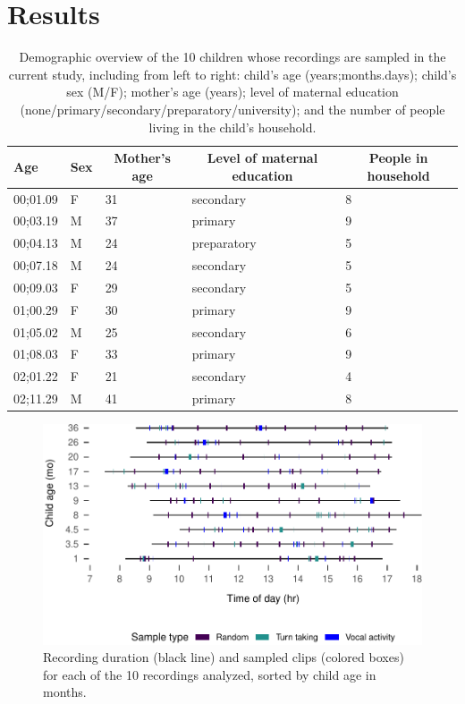 \documentclass[,man,floatsintext]{apa6}
\begin{document}
\section{Results}\label{results}

\begin{table}[tbp]
\begin{center}
\begin{threeparttable}
\caption{\label{tab:tab1}Demographic overview of the 10 children whose recordings are sampled in the current study, including from left to right: child's age (years;months.days); child's sex (M/F); mother's age (years); level of maternal education (none/primary/secondary/preparatory/university); and the number of people living in the child's household.}
\begin{tabular}{lllll}
\toprule
Age & \multicolumn{1}{c}{Sex} & \multicolumn{1}{c}{Mother's age} & \multicolumn{1}{c}{Level of maternal education} & \multicolumn{1}{c}{People in household}\\
\midrule
00;01.09 & F & 31 & secondary & 8\\
00;03.19 & M & 37 & primary & 9\\
00;04.13 & M & 24 & preparatory & 5\\
00;07.18 & M & 24 & secondary & 5\\
00;09.03 & F & 29 & secondary & 5\\
01;00.29 & F & 30 & primary & 9\\
01;05.02 & M & 25 & secondary & 6\\
01;08.03 & F & 33 & primary & 9\\
02;01.22 & F & 21 & secondary & 4\\
02;11.29 & M & 41 & primary & 8\\
\bottomrule
\end{tabular}
\end{threeparttable}
\end{center}
\end{table}

\begin{figure}
\centering
\includegraphics{Yeli-CLE_files/figure-latex/fig2-1.pdf}
\caption{\label{fig:fig2}Recording duration (black line) and sampled clips
(colored boxes) for each of the 10 recordings analyzed, sorted by child
age in months.}
\end{figure}
\end{document}
